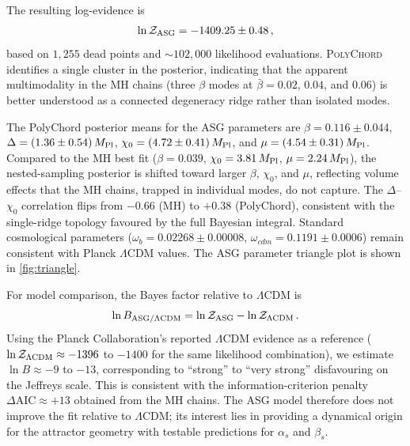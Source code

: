 \documentclass[11pt,a4paper]{article}
\begin{document}
The resulting log-evidence is
\begin{equation}
\ln\mathcal{Z}_{\rm ASG}=-1409.25\pm0.48\,,
\label{eq:lnZ}
\end{equation}
based on $1{,}255$ dead points and ${\sim}102{,}000$ likelihood evaluations. \textsc{PolyChord} identifies a single cluster in the posterior, indicating that the apparent multimodality in the MH chains (three $\beta$ modes at $\bar\beta=0.02$, $0.04$, and $0.06$) is better understood as a connected degeneracy ridge rather than isolated modes.

The PolyChord posterior means for the ASG parameters are $\beta=0.116\pm0.044$, $\Delta=(1.36\pm0.54)\,M_{\rm Pl}$, $\chi_0=(4.72\pm0.41)\,M_{\rm Pl}$, and $\mu=(4.54\pm0.31)\,M_{\rm Pl}$. Compared to the MH best fit ($\beta=0.039$, $\chi_0=3.81\,M_{\rm Pl}$, $\mu=2.24\,M_{\rm Pl}$), the nested-sampling posterior is shifted toward larger $\beta$, $\chi_0$, and $\mu$, reflecting volume effects that the MH chains, trapped in individual modes, do not capture. The $\Delta$--$\chi_0$ correlation flips from $-0.66$ (MH) to $+0.38$ (PolyChord), consistent with the single-ridge topology favoured by the full Bayesian integral. Standard cosmological parameters ($\omega_b=0.02268\pm0.00008$, $\omega_{cdm}=0.1191\pm0.0006$) remain consistent with Planck $\Lambda$CDM values. The ASG parameter triangle plot is shown in \cref{fig:triangle}.

For model comparison, the Bayes factor relative to $\Lambda$CDM is
\begin{equation}
\ln B_{\rm ASG/\Lambda CDM}=\ln\mathcal{Z}_{\rm ASG}-\ln\mathcal{Z}_{\Lambda\rm CDM}\,.
\end{equation}
Using the Planck Collaboration's reported $\Lambda$CDM evidence as a reference ($\ln\mathcal{Z}_{\Lambda\rm CDM}\approx-1396$ to $-1400$ for the same likelihood combination), we estimate $\ln B\approx-9$ to $-13$, corresponding to ``strong'' to ``very strong'' disfavouring on the Jeffreys scale. This is consistent with the information-criterion penalty $\Delta\text{AIC}\approx+13$ obtained from the MH chains. The ASG model therefore does not improve the fit relative to $\Lambda$CDM; its interest lies in providing a dynamical origin for the attractor geometry with testable predictions for $\alpha_s$ and $\beta_s$.
\end{document}
